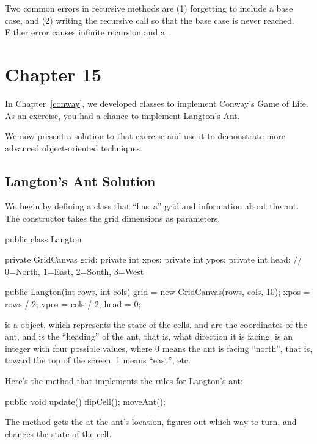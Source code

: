 Two common errors in recursive methods are (1) forgetting to include a base case, and (2) writing the recursive call so that the base case is never reached.
Either error causes infinite recursion and a .


\section{Chapter 15}
\label{app:langton}

In Chapter~\ref{conway}, we developed classes to implement Conway's Game of Life.
As an exercise, you had a chance to implement Langton's Ant.

We now present a solution to that exercise and use it to demonstrate more advanced object-oriented techniques.


\subsection*{Langton's Ant Solution}

We begin by defining a  class that ``has~a'' grid and information about the ant.
The constructor takes the grid dimensions as parameters.

\begin{code}
public class Langton {
    private GridCanvas grid;
    private int xpos;
    private int ypos;
    private int head; // 0=North, 1=East, 2=South, 3=West

    public Langton(int rows, int cols) {
        grid = new GridCanvas(rows, cols, 10);
        xpos = rows / 2;
        ypos = cols / 2;
        head = 0;
    }
}
\end{code}

 is a  object, which represents the state of the cells.
 and  are the coordinates of the ant, and  is the ``heading'' of the ant, that is, what direction it is facing.
 is an integer with four possible values, where 0 means the ant is facing ``north'', that is, toward the top of the screen, 1 means ``east'', etc.

Here's the  method that implements the rules for Langton's ant:

\begin{code}
public void update() {
    flipCell();
    moveAnt();
}
\end{code}

The  method gets the  at the ant's location, figures out which way to turn, and changes the state of the cell.

